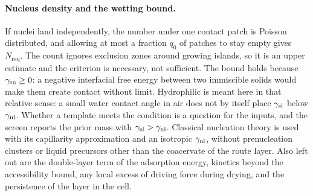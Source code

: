 \paragraph*{Nucleus density and the wetting bound.}
If nuclei land independently, the number under one contact patch is Poisson distributed, and allowing at most a fraction $q_0$ of patches to stay empty gives $N_\mathrm{req}$. %
The count ignores exclusion zones around growing islands, so it is an upper estimate and the criterion is necessary, not sufficient. %
The bound holds because $\gamma_\mathrm{sn}\ge0$: a negative interfacial free energy between two immiscible solids would make them create contact without limit. %
Hydrophilic is meant here in that relative sense: a small water contact angle in air does not by itself place $\gamma_\mathrm{sl}$ below $\gamma_\mathrm{nl}$. %
Whether a template meets the condition is a question for the inputs, and the screen reports the prior mass with $\gamma_\mathrm{sl}>\gamma_\mathrm{nl}$. %
Classical nucleation theory is used with its capillarity approximation and an isotropic $\gamma_\mathrm{nl}$, without prenucleation clusters or liquid precursors other than the coacervate of the route layer. %
Also left out are the double-layer term of the adsorption energy, kinetics beyond the accessibility bound, any local excess of driving force during drying, and the persistence of the layer in the cell. %
